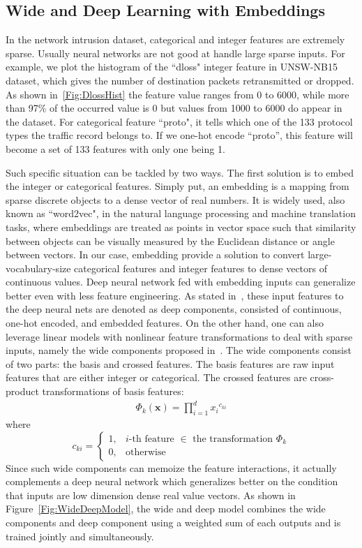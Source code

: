 \subsection{Wide and Deep Learning with Embeddings}
\label{SubSec:WD}
In the network intrusion dataset, categorical and integer features are extremely sparse.
Usually neural networks are not good at handle large sparse inputs.
For example, we plot the histogram of the ``dloss" integer feature in UNSW-NB15 dataset, which gives
the number of destination packets retransmitted or dropped.
As shown in~\ref{Fig:DlossHist} the feature value ranges from 0 to 6000, while more than 97\%
of the occurred value is 0 but values from 1000 to 6000 do appear in the dataset.
For categorical feature ``proto", it tells which one of the 133 protocol types the traffic record belongs to.
If we one-hot encode ``proto'', this feature will become a set of 133 features with only one being 1.

Such specific situation can be tackled by two ways.
The first solution is to embed the integer or categorical features. %
Simply put, an embedding is a mapping from sparse discrete objects to a dense vector of real numbers.
It is widely used, also known as ``word2vec", in the natural language processing and machine translation tasks,
where embeddings are treated as points in vector space such that similarity between objects can be visually measured
by the Euclidean distance or angle between vectors.
In our case, embedding provide a solution to convert large-vocabulary-size categorical features
and integer features to dense vectors of continuous values.
Deep neural network fed with embedding inputs can generalize better even with less feature engineering.
As stated in~\cite{WideDeepModel}, these input features to the deep neural nets are denoted as deep components, consisted of continuous, one-hot encoded, and embedded features.
On the other hand, one can also leverage linear models with nonlinear feature transformations to deal with sparse inputs,
namely the wide components proposed in~\cite{WideDeepModel}.
The wide components consist of two parts: the basis and crossed features.
The basis features are raw input features that are either integer or categorical.
The crossed features are cross-product transformations of basis features:
\begin{align}
    \Phi_k (\bm{x} ) = \prod_{i=1}^{d} {x_i}^{c_{ki}}
\end{align}
where
\[
    c_{ki} = 
    \begin{cases}
        1, & \text{$i$-th feature $\in$ the transformation $\Phi_k$} \\
        0, & \text{otherwise}
    \end{cases}
\]
Since such wide components can memoize the feature interactions, it actually complements a deep neural network
which generalizes better on the condition that inputs are low dimension dense real value vectors.
As shown in Figure~\ref{Fig:WideDeepModel}, the wide and deep model combines the wide components and deep component
using a weighted sum of each outputs and is trained jointly and simultaneously.

